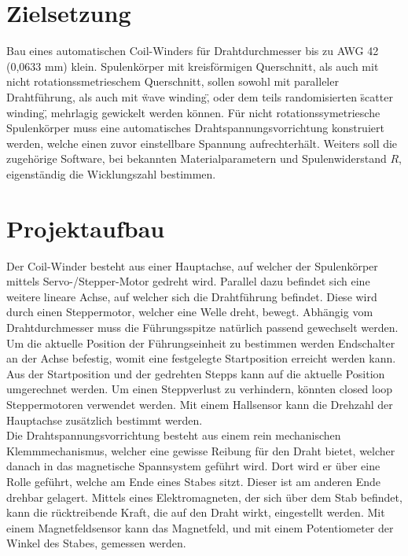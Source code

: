 \section*{Zielsetzung}
Bau eines automatischen Coil-Winders für Drahtdurchmesser bis zu AWG 42 (0,0633 mm) klein. Spulenkörper mit kreisförmigen Querschnitt, als auch mit nicht rotationssmetrieschem Querschnitt, sollen sowohl mit paralleler Drahtführung, als auch mit \"wave winding\", oder dem teils randomisierten \"scatter winding\", mehrlagig gewickelt werden können. Für nicht rotationssymetriesche Spulenkörper muss eine automatisches Drahtspannungsvorrichtung konstruiert werden, welche einen zuvor einstellbare Spannung aufrechterhält. Weiters soll die zugehörige Software, bei bekannten Materialparametern und Spulenwiderstand $R$, eigenständig die Wicklungszahl bestimmen.  

\section*{Projektaufbau}

Der Coil-Winder besteht aus einer Hauptachse, auf welcher der Spulenkörper mittels Servo-/Stepper-Motor gedreht wird. Parallel dazu befindet sich eine weitere lineare Achse, auf welcher sich die Drahtführung befindet. Diese wird durch einen Steppermotor, welcher eine Welle dreht, bewegt. Abhängig vom Drahtdurchmesser muss die Führungsspitze natürlich passend gewechselt werden. Um die aktuelle Position der Führungseinheit zu bestimmen werden Endschalter an der Achse befestig, womit eine festgelegte Startposition erreicht werden kann. Aus der Startposition und der gedrehten Stepps kann auf die aktuelle Position umgerechnet werden. Um einen Steppverlust zu verhindern, könnten closed loop Steppermotoren verwendet werden. Mit einem Hallsensor kann die Drehzahl der Hauptachse zusätzlich bestimmt werden.\\
Die Drahtspannungsvorrichtung besteht aus einem rein mechanischen Klemmmechanismus, welcher eine gewisse Reibung für den Draht bietet, welcher danach in das magnetische Spannsystem geführt wird. Dort wird er über eine Rolle geführt, welche am Ende eines Stabes sitzt. Dieser ist am anderen Ende drehbar gelagert. Mittels eines Elektromagneten, der sich über dem Stab befindet, kann die rücktreibende Kraft, die auf den Draht wirkt, eingestellt werden. Mit einem Magnetfeldsensor kann das Magnetfeld, und mit einem Potentiometer der Winkel des Stabes, gemessen werden.


